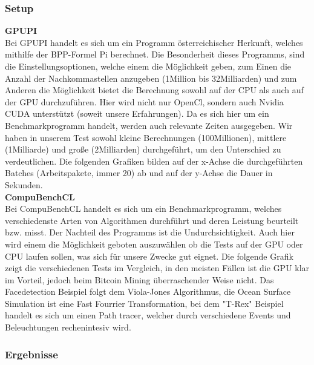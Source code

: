 \subsubsection{Setup}
\textbf{GPUPI}\\
Bei GPUPI handelt es sich um ein Programm österreichischer Herkunft, welches mithilfe der BPP-Formel Pi berechnet. Die Besonderheit dieses Programms, sind die Einstellungsoptionen, welche einem die Möglichkeit geben, zum Einen die Anzahl der Nachkommastellen anzugeben (1Million bis 32Milliarden) und zum Anderen die Möglichkeit bietet die Berechnung sowohl auf der CPU als auch auf der GPU durchzuführen. Hier wird nicht nur OpenCl, sondern auch Nvidia CUDA unterstützt (soweit unsere Erfahrungen). Da es sich hier um ein Benchmarkprogramm handelt, werden auch relevante Zeiten ausgegeben. Wir haben in unserem Test sowohl kleine Berechnungen (100Millionen), mittlere (1Milliarde) und große (2Milliarden) durchgeführt, um den Unterschied zu verdeutlichen.
Die folgenden Grafiken bilden auf der x-Achse die durchgeführten Batches (Arbeitspakete, immer 20) ab und auf der y-Achse die Dauer in Sekunden.\cite{gpupi}\\[0.3cm]
\textbf{CompuBenchCL}\\
Bei CompuBenchCL handelt es sich um ein Benchmarkprogramm, welches verschiedenste Arten von Algorithmen durchführt und deren Leistung beurteilt bzw. misst. Der Nachteil des Programms ist die Undurchsichtigkeit.
Auch hier wird einem die Möglichkeit geboten auszuwählen ob die Tests auf der GPU oder CPU laufen sollen, was sich für unsere Zwecke gut eignet. 
Die folgende Grafik zeigt die verschiedenen Tests im Vergleich, in den meisten Fällen ist die GPU klar im Vorteil, jedoch beim Bitcoin Mining überraschender Weise nicht.
Das Facedetection Beispiel folgt dem Viola-Jones Algorithmus, die Ocean Surface Simulation ist eine Fast Fourrier Transformation, bei dem "T-Rex" Beispiel handelt es sich um einen Path tracer, welcher durch verschiedene Events und Beleuchtungen rechenintesiv wird. \cite{compubench}
\subsubsection{Ergebnisse}

